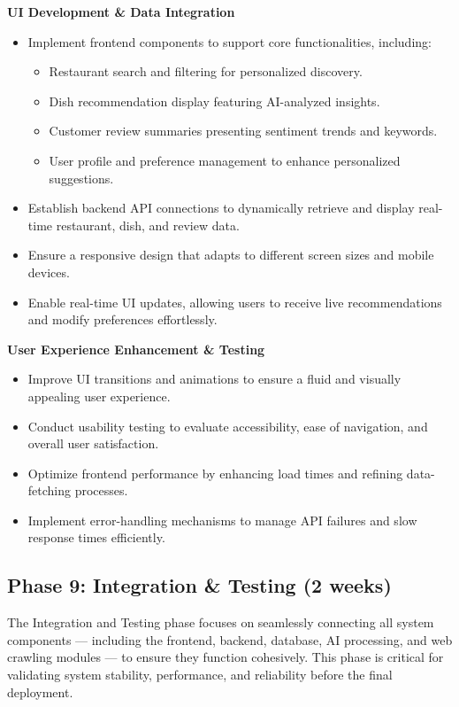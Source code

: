 \textbf{UI Development \& Data Integration}
\begin{itemize}
\item Implement frontend components to support core functionalities, including:
	\begin{itemize}
	\item Restaurant search and filtering for personalized discovery.
	\item Dish recommendation display featuring AI-analyzed insights.
	\item Customer review summaries presenting sentiment trends and keywords.
	\item User profile and preference management to enhance personalized suggestions.
	\end{itemize}
\item Establish backend API connections to dynamically retrieve and display real-time restaurant, dish, and review data.
\item Ensure a responsive design that adapts to different screen sizes and mobile devices.
\item Enable real-time UI updates, allowing users to receive live recommendations and modify preferences effortlessly.
\end{itemize}

\textbf{User Experience Enhancement \& Testing}
\begin{itemize}
\item Improve UI transitions and animations to ensure a fluid and visually appealing user experience.
\item Conduct usability testing to evaluate accessibility, ease of navigation, and overall user satisfaction.
\item Optimize frontend performance by enhancing load times and refining data-fetching processes.
\item Implement error-handling mechanisms to manage API failures and slow response times efficiently.
\end{itemize}

\subsection*{Phase 9: Integration \& Testing (2 weeks)}
The Integration and Testing phase focuses on seamlessly connecting all system components — including the frontend, backend, database, AI processing, and web crawling modules — to ensure they function cohesively. This phase is critical for validating system stability, performance, and reliability before the final deployment.

